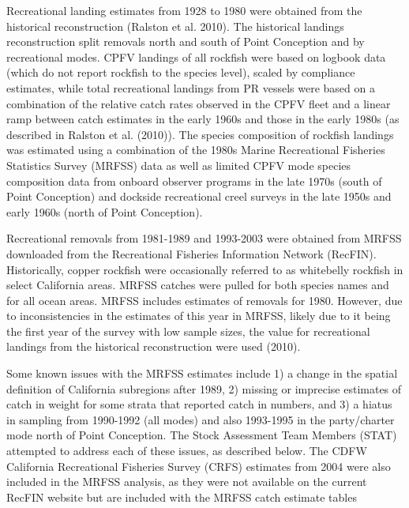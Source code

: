 \documentclass[11pt,
  english,
  letterpaper,
]{article}
\begin{document}
Recreational landing estimates from 1928 to 1980 were obtained from the historical reconstruction (Ralston et al. 2010). The historical landings reconstruction split removals north and south of Point Conception and by recreational modes. CPFV landings of all rockfish were based on logbook data (which do not report rockfish to the species level), scaled by compliance estimates, while total recreational landings from PR vessels were based on a combination of the relative catch rates observed in the CPFV fleet and a linear ramp between catch estimates in the early 1960s and those in the early 1980s (as described in Ralston et al. (2010)). The species composition of rockfish landings was estimated using a combination of the 1980s Marine Recreational Fisheries Statistics Survey (MRFSS) data as well as limited CPFV mode species composition data from onboard observer programs in the late 1970s (south of Point Conception) and dockside recreational creel surveys in the late 1950s and early 1960s (north of Point Conception).

Recreational removals from 1981-1989 and 1993-2003 were obtained from MRFSS downloaded from the Recreational Fisheries Information Network (RecFIN). Historically, copper rockfish were occasionally referred to as whitebelly rockfish in select California areas. MRFSS catches were pulled for both species names and for all ocean areas. MRFSS includes estimates of removals for 1980. However, due to inconsistencies in the estimates of this year in MRFSS, likely due to it being the first year of the survey with low sample sizes, the value for recreational landings from the historical reconstruction were used (2010).

Some known issues with the MRFSS estimates include 1) a change in the spatial definition of California subregions after 1989, 2) missing or imprecise estimates of catch in weight for some strata that reported catch in numbers, and 3) a hiatus in sampling from 1990-1992 (all modes) and also 1993-1995 in the party/charter mode north of Point Conception. The Stock Assessment Team Members (STAT) attempted to address each of these issues, as described below. The CDFW California Recreational Fisheries Survey (CRFS) estimates from 2004 were also included in the MRFSS analysis, as they were not available on the current RecFIN website but are included with the MRFSS catch estimate tables
\end{document}
